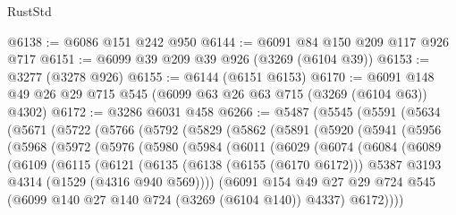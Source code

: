 \begin{lexlean}{RustStd}
\begin{coremodule}
@6138 := @6086 @151 @242 @950
@6144 := @6091 @84 @150 @209 @117 @926 @717
@6151 := @6099 @39 @209 @39 @926 (@3269 (@6104 @39))
@6153 := @3277 (@3278 @926)
@6155 := @6144 (@6151 @6153)
@6170 := @6091 @148 @49 @26 @29 @715 @545 (@6099 @63 @26 @63 @715 (@3269 (@6104 @63)) @4302)
@6172 := @3286 @6031 @458
@6266 := @5487
    (@5545
      (@5591
        (@5634
          (@5671
            (@5722
              (@5766
                (@5792
                  (@5829
                    (@5862
                      (@5891
                        (@5920
                          (@5941
                            (@5956
                              (@5968
                                (@5972
                                  (@5976
                                    (@5980
                                      (@5984
                                        (@6011
                                          (@6029
                                            (@6074
                                              (@6084
                                                (@6089
                                                  (@6109
                                                    (@6115
                                                      (@6121
                                                        (@6135
                                                          (@6138 (@6155 (@6170 @6172)))
                                                          @5387
                                                          @3193
                                                          @4314
                                                          (@1529 (@4316 @940 @569))))
                                                      (@6091
                                                        @154
                                                        @49
                                                        @27
                                                        @29
                                                        @724
                                                        @545
                                                        (@6099
                                                          @140
                                                          @27
                                                          @140
                                                          @724
                                                          (@3269 (@6104 @140))
                                                          @4337)
                                                        @6172))))

\end{coremodule}
\end{lexlean}
